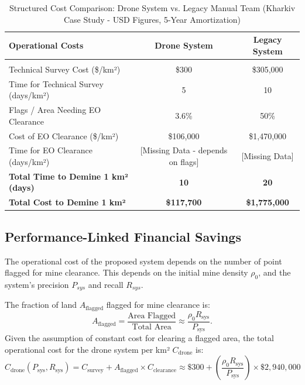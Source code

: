 \begin{table}[h!]
\centering
\caption{Structured Cost Comparison: Drone System vs. Legacy Manual Team (Kharkiv Case Study - USD Figures, 5-Year Amortization)}
\label{tab:cost_comparison_structured}

\begin{tabular}{lcc} 
\toprule
\textbf{Operational Costs} & \textbf{Drone System} & \textbf{Legacy System} \\
\midrule
\multicolumn{3}{l}{} \\
Technical Survey Cost (\$/km²) & \$300 & \$305,000 \\ 
Time for Technical Survey (days/km²) &  5 & 10 \\ 
Flags / Area Needing EO Clearance & 3.6\% & 50\% \\ 
Cost of EO Clearance (\$/km²) & \$106,000 & \$1,470,000 \\
Time for EO Clearance (days/km²) & [Missing Data - depends on flags] & [Missing Data] \\ \addlinespace
\textbf{Total Time to Demine 1 km² (days)} & \textbf{10} & \textbf{20} \\ \addlinespace
\textbf{Total Cost to Demine 1 km² } & \textbf{\$117,700} & \textbf{\$1,775,000}  \\
\bottomrule
\end{tabular}
\end{table}

\subsection{Performance-Linked Financial Savings} \label{subsec:performance_savings}

The operational cost of the proposed system depends on the number of point flagged for mine clearance. This depends on the initial mine density $\rho_0$, and the system's precision $P_{sys}$ and recall $R_{sys}$. 

The fraction of land $A_\text{flagged}$ flagged for mine clearance is:
\begin{equation}
A_{\text{flagged}} = \frac{\text{Area Flagged}}{\text{Total Area}} \approx  \frac{\rho_0 R_\text{sys}}{P_\text{sys}}. 
\label{eq:flags_fraction} %
\end{equation}
Given the assumption of constant cost for clearing a flagged area, the total operational cost for the drone system per km² $C_{\text{drone}}$ is:
\begin{equation}
C_{\text{drone}}(P_\text{sys}, R_\text{sys}) = C_{\text{survey}} + A_{\text{flagged}} \times C_{\text{clearance}} 
\approx \$300 + \left( \frac{\rho_0 R_\text{sys}}{P_\text{sys}} \right) \times \$2,940,000 
\label{eq:drone_op_cost} %
\end{equation}



